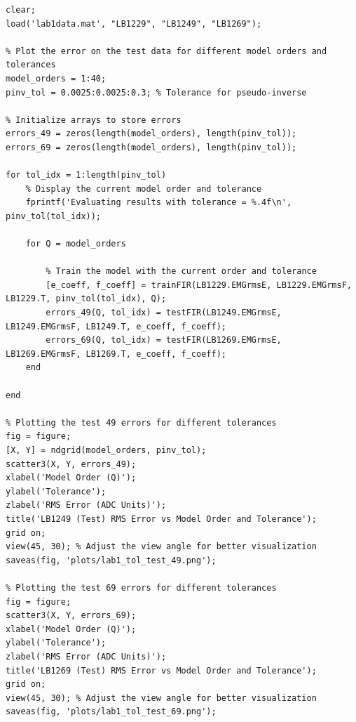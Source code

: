 \documentclass[12pt]{article}
\begin{document}
\newpage
\begin{lstlisting}[caption={generate\_tol\_test.m}]
% Generates 3D error plots for Q = 1:40, Tol = 0.0025:0.0025:0.3
clear;
load('lab1data.mat', "LB1229", "LB1249", "LB1269");

% Plot the error on the test data for different model orders and tolerances
model_orders = 1:40;
pinv_tol = 0.0025:0.0025:0.3; % Tolerance for pseudo-inverse

% Initialize arrays to store errors
errors_49 = zeros(length(model_orders), length(pinv_tol));
errors_69 = zeros(length(model_orders), length(pinv_tol));

for tol_idx = 1:length(pinv_tol)
    % Display the current model order and tolerance
    fprintf('Evaluating results with tolerance = %.4f\n', pinv_tol(tol_idx));

    for Q = model_orders

        % Train the model with the current order and tolerance
        [e_coeff, f_coeff] = trainFIR(LB1229.EMGrmsE, LB1229.EMGrmsF, LB1229.T, pinv_tol(tol_idx), Q);
        errors_49(Q, tol_idx) = testFIR(LB1249.EMGrmsE, LB1249.EMGrmsF, LB1249.T, e_coeff, f_coeff);
        errors_69(Q, tol_idx) = testFIR(LB1269.EMGrmsE, LB1269.EMGrmsF, LB1269.T, e_coeff, f_coeff);
    end

end

% Plotting the test 49 errors for different tolerances
fig = figure;
[X, Y] = ndgrid(model_orders, pinv_tol);
scatter3(X, Y, errors_49);
xlabel('Model Order (Q)');
ylabel('Tolerance');
zlabel('RMS Error (ADC Units)');
title('LB1249 (Test) RMS Error vs Model Order and Tolerance');
grid on;
view(45, 30); % Adjust the view angle for better visualization
saveas(fig, 'plots/lab1_tol_test_49.png');

% Plotting the test 69 errors for different tolerances
fig = figure;
scatter3(X, Y, errors_69);
xlabel('Model Order (Q)');
ylabel('Tolerance');
zlabel('RMS Error (ADC Units)');
title('LB1269 (Test) RMS Error vs Model Order and Tolerance');
grid on;
view(45, 30); % Adjust the view angle for better visualization
saveas(fig, 'plots/lab1_tol_test_69.png');
\end{lstlisting}
\end{document}
